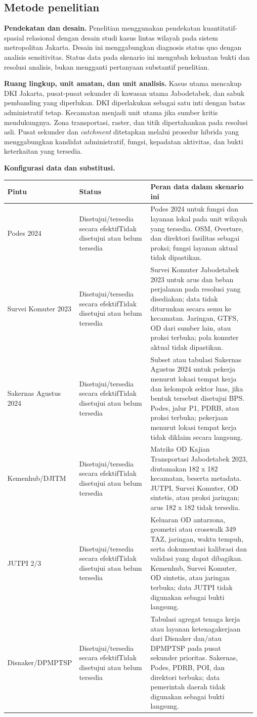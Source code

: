 \documentclass[11pt]{article}
\newcommand{\Status}[1]{%
  \ifnum#1=1 Disetujui/tersedia secara efektif\else Tidak disetujui atau belum tersedia\fi%
}
\newcommand{\RolePodes}[1]{%
  \ifnum#1=1
    Podes 2024 untuk fungsi dan layanan lokal pada unit wilayah yang tersedia.
  \else
    OSM, Overture, dan direktori fasilitas sebagai proksi; fungsi layanan aktual tidak dipastikan.
  \fi%
}
\newcommand{\RoleKomuter}[1]{%
  \ifnum#1=1
    Survei Komuter Jabodetabek 2023 untuk arus dan beban perjalanan pada resolusi yang disediakan; data tidak diturunkan secara semu ke kecamatan.
  \else
    Jaringan, GTFS, OD dari sumber lain, atau proksi terbuka; pola komuter aktual tidak dipastikan.
  \fi%
}
\newcommand{\RoleSakernas}[1]{%
  \ifnum#1=1
    Subset atau tabulasi Sakernas Agustus 2024 untuk pekerja menurut lokasi tempat kerja dan kelompok sektor luas, jika bentuk tersebut disetujui BPS.
  \else
    Podes, jalur P1, PDRB, atau proksi terbuka; pekerjaan menurut lokasi tempat kerja tidak diklaim secara langsung.
  \fi%
}
\newcommand{\RoleDJITM}[1]{%
  \ifnum#1=1
    Matriks OD Kajian Transportasi Jabodetabek 2023, diutamakan 182 x 182 kecamatan, beserta metadata.
  \else
    JUTPI, Survei Komuter, OD sintetis, atau proksi jaringan; arus 182 x 182 tidak tersedia.
  \fi%
}
\newcommand{\RoleJUTPI}[1]{%
  \ifnum#1=1
    Keluaran OD antarzona, geometri atau crosswalk 349 TAZ, jaringan, waktu tempuh, serta dokumentasi kalibrasi dan validasi yang dapat dibagikan.
  \else
    Kemenhub, Survei Komuter, OD sintetis, atau jaringan terbuka; data JUTPI tidak digunakan sebagai bukti langsung.
  \fi%
}
\newcommand{\RolePemda}[1]{%
  \ifnum#1=1
    Tabulasi agregat tenaga kerja atau layanan ketenagakerjaan dari Disnaker dan/atau DPMPTSP pada pusat sekunder prioritas.
  \else
    Sakernas, Podes, PDRB, POI, dan direktori terbuka; data pemerintah daerah tidak digunakan sebagai bukti langsung.
  \fi%
}
\begin{document}
{{{{{{            \subsection*{Metode penelitian}

            \textbf{Pendekatan dan desain.} Penelitian menggunakan pendekatan kuantitatif-spasial relasional dengan desain studi kasus lintas wilayah pada sistem metropolitan Jakarta. Desain ini menggabungkan diagnosis status quo dengan analisis sensitivitas. Status data pada skenario ini mengubah kekuatan bukti dan resolusi analisis, bukan mengganti pertanyaan substantif penelitian.

            \textbf{Ruang lingkup, unit amatan, dan unit analisis.} Kasus utama mencakup DKI Jakarta, pusat-pusat sekunder di kawasan utama Jabodetabek, dan sabuk pembanding yang diperlukan. DKI diperlakukan sebagai satu inti dengan batas administratif tetap. Kecamatan menjadi unit utama jika sumber kritis mendukungnya. Zona transportasi, raster, dan titik dipertahankan pada resolusi asli. Pusat sekunder dan \textit{catchment} ditetapkan melalui prosedur hibrida yang menggabungkan kandidat administratif, fungsi, kepadatan aktivitas, dan bukti keterkaitan yang tersedia.

            \textbf{Konfigurasi data dan substitusi.}\par\medskip
            {\small
            \begin{tabularx}{\textwidth}{@{}P{0.22\textwidth}P{0.25\textwidth}Y@{}}
            \toprule
            Pintu & Status & Peran data dalam skenario ini \\
            \midrule
            Podes 2024 & \Status{\podes} & \RolePodes{\podes} \\
            Survei Komuter 2023 & \Status{\komuter} & \RoleKomuter{\komuter} \\
            Sakernas Agustus 2024 & \Status{\sakernas} & \RoleSakernas{\sakernas} \\
            Kemenhub/DJITM & \Status{\djitm} & \RoleDJITM{\djitm} \\
            JUTPI 2/3 & \Status{\jutpi} & \RoleJUTPI{\jutpi} \\
            Disnaker/DPMPTSP & \Status{\pemda} & \RolePemda{\pemda} \\
            \bottomrule
            \end{tabularx}
            }

}}}}}}
\end{document}
